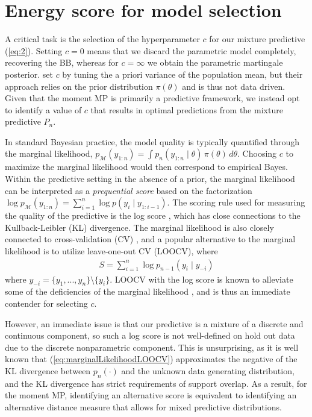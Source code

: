 \documentclass[11pt,a4paper]{article}
\theoremstyle{plain}
\theoremstyle{remark}
\theoremstyle{remark}
\begin{document}
\section{Energy score for model selection}


A critical task is the selection of the hyperparameter $c$ for our mixture predictive (\ref{eq:2}). Setting
 $c =0$ means that we discard the parametric model completely, recovering the BB, whereas for $c =\infty$ we obtain the parametric martingale posterior. \cite{Lyddon2018} set $c$ by tuning the a priori variance of the population mean, but their approach relies on the prior distribution $\pi(\theta)$ and is thus not data driven. 
 Given that the moment MP is primarily a predictive framework, we instead opt to identify a value of $c$ that results in optimal predictions from the mixture predictive $P_n$. 


In standard Bayesian practice, the model quality is typically quantified through the marginal likelihood,
$p_\mathcal{M}(y_{1:n})=\int p_n(y_{1:n}\mid \theta)\, \pi(\theta)\, d\theta.$
 Choosing $c$ to maximize the marginal likelihood would then correspond to empirical Bayes. Within the predictive setting in the absence of a prior, the marginal likelihood can be interpreted as a \textit{prequential score} \citep{dawid1984present} based on the factorization
$\log p_\mathcal{M}(y_{1:n}) = \sum_{i = 1}^n \log p(y_i \mid y_{1:i-1})$.
The scoring rule used for measuring the quality of the predictive is the log score \citep{gneiting2007strictly}, which has close connections to the Kullback-Leibler (KL) divergence. The marginal likelihood is also closely connected to cross-validation (CV) \citep{gneiting2007strictly, fong2020marginal}, and a popular alternative to the marginal likelihood is to utilize leave-one-out CV (LOOCV), where 
\begin{align}\label{eq:marginalLikelihoodLOOCV}
    S = \sum_{i=1}^n \log p_{n-1}(y_i \mid y_{-i}) 
\end{align}
 where $y_{-i}= \{y_1,...,y_n\}\setminus \{y_i\}$. LOOCV with the log score is known to alleviate some of the deficiencies of the marginal likelihood \citep{Vehtari2012}, and is thus an immediate contender for selecting $c$. 



However, an immediate issue is that our predictive is a mixture of a discrete and continuous component, so such a log score is not well-defined on hold out data due to the discrete nonparametric component. 
This is unsurprising, as it is well known that (\ref{eq:marginalLikelihoodLOOCV}) approximates the negative of the KL divergence between $p_n(\cdot)$ and the unknown data generating distribution, and the KL divergence has strict requirements of support overlap. As a result, for the moment MP, identifying an alternative score is equivalent to identifying an alternative distance measure that allows for mixed predictive distributions. 
\end{document}
